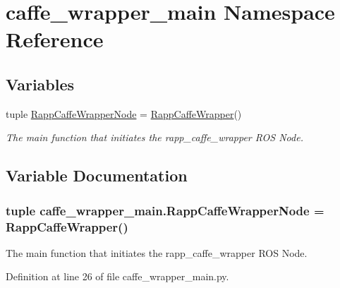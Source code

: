\hypertarget{namespacecaffe__wrapper__main}{\section{caffe\-\_\-wrapper\-\_\-main Namespace Reference}
\label{namespacecaffe__wrapper__main}
}
\subsection*{Variables}
\begin{DoxyCompactItemize}
\item 
tuple \hyperlink{namespacecaffe__wrapper__main_a8ab432c9a16684277065d99e428078f2}{Rapp\-Caffe\-Wrapper\-Node} = \hyperlink{classcaffe__wrapper_1_1RappCaffeWrapper}{Rapp\-Caffe\-Wrapper}()
\begin{DoxyCompactList}\small\item\em The main function that initiates the rapp\-\_\-caffe\-\_\-wrapper R\-O\-S Node. \end{DoxyCompactList}\end{DoxyCompactItemize}


\subsection{Variable Documentation}
\hypertarget{namespacecaffe__wrapper__main_a8ab432c9a16684277065d99e428078f2}{
\subsubsection[{Rapp\-Caffe\-Wrapper\-Node}]{\setlength{\rightskip}{0pt plus 5cm}tuple caffe\-\_\-wrapper\-\_\-main.\-Rapp\-Caffe\-Wrapper\-Node = {\bf Rapp\-Caffe\-Wrapper}()}}\label{namespacecaffe__wrapper__main_a8ab432c9a16684277065d99e428078f2}


The main function that initiates the rapp\-\_\-caffe\-\_\-wrapper R\-O\-S Node. 



Definition at line 26 of file caffe\-\_\-wrapper\-\_\-main.\-py.

